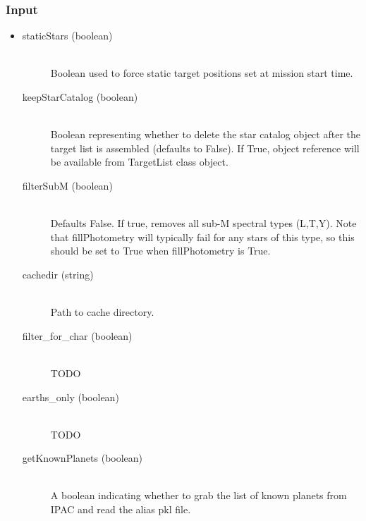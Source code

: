 \documentclass[cleanfoot]{asme2ej}
\begin{document}
\subsubsection*{Input}
\begin{itemize}
\item 
\begin{description}
    \item[staticStars (boolean)] \hfill \\ Boolean used to force static target positions set at mission start time.
    \item[keepStarCatalog (boolean)] \hfill \\ Boolean representing whether to delete the star catalog object after the target list is assembled (defaults to False).  If True, object reference will be available from TargetList class object.
    \item[filterSubM (boolean)] \hfill \\ Defaults False. If true, removes all sub-M spectral types (L,T,Y). Note that fillPhotometry will typically fail for any stars of this type, so this should be set to True when fillPhotometry is True.
    \item[cachedir (string)] \hfill \\ Path to cache directory.
    \item[filter\_for\_char (boolean)] \hfill \\ TODO
    \item[earths\_only (boolean)] \hfill \\ TODO
    \item[getKnownPlanets (boolean)] \hfill \\ A boolean indicating whether to grab the list of known planets from IPAC and read the alias pkl file.
\end{description}
\end{itemize}
\end{document}
